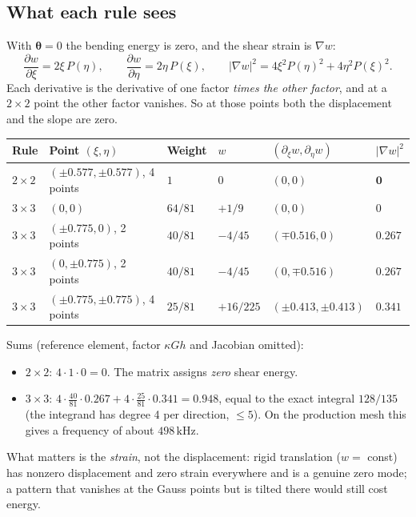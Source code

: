 \subsection{What each rule sees}
With $\boldsymbol{\theta} = 0$ the bending energy is zero, and the shear strain is
$\nabla w$:
\begin{equation}
  \frac{\partial w}{\partial \xi} = 2\xi\, P(\eta), \qquad
  \frac{\partial w}{\partial \eta} = 2\eta\, P(\xi), \qquad
  |\nabla w|^2 = 4\xi^2 P(\eta)^2 + 4\eta^2 P(\xi)^2 .
\end{equation}
Each derivative is the derivative of one factor \emph{times the other factor}, and
at a $2\times 2$ point the other factor vanishes. So at those points both the
displacement and the slope are zero.
\begin{center}
\begin{tabular}{|l|l|l|l|l|l|}
\hline
Rule & Point $(\xi, \eta)$ & Weight & $w$ & $(\partial_\xi w, \partial_\eta w)$ & $|\nabla w|^2$ \\
\hline
$2\times 2$ & $(\pm 0.577, \pm 0.577)$, 4 points & $1$ & $0$ & $(0, 0)$ & $\mathbf{0}$ \\
\hline
$3\times 3$ & $(0, 0)$ & $64/81$ & $+1/9$ & $(0, 0)$ & $0$ \\
$3\times 3$ & $(\pm 0.775, 0)$, 2 points & $40/81$ & $-4/45$ & $(\mp 0.516, 0)$ & $\mathbf{0.267}$ \\
$3\times 3$ & $(0, \pm 0.775)$, 2 points & $40/81$ & $-4/45$ & $(0, \mp 0.516)$ & $\mathbf{0.267}$ \\
$3\times 3$ & $(\pm 0.775, \pm 0.775)$, 4 points & $25/81$ & $+16/225$ & $(\pm 0.413, \pm 0.413)$ & $\mathbf{0.341}$ \\
\hline
\end{tabular}
\end{center}
Sums (reference element, factor $\kappa G h$ and Jacobian omitted):
\begin{itemize}
  \item $2\times 2$: $4 \cdot 1 \cdot 0 = 0$. The matrix assigns \emph{zero} shear energy.
  \item $3\times 3$: $4 \cdot \tfrac{40}{81} \cdot 0.267 + 4 \cdot \tfrac{25}{81} \cdot 0.341
        = 0.948$, equal to the exact integral $128/135$ (the integrand has degree 4 per
        direction, $\le 5$). On the production mesh this gives a frequency of
        about $498\,\mathrm{kHz}$.
\end{itemize}
What matters is the \emph{strain}, not the displacement: rigid translation
($w = $ const) has nonzero displacement and zero strain everywhere and is a genuine
zero mode; a pattern that vanishes at the Gauss points but is tilted there would still
cost energy.


